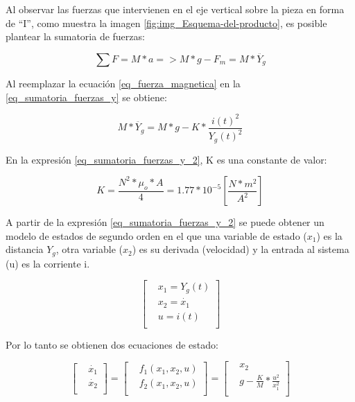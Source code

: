 \noindent Al observar las fuerzas que intervienen en el eje vertical sobre la pieza en forma de ``I'', como muestra la imagen \ref{fig:img_Esquema-del-producto}, es posible plantear la sumatoria de fuerzas:

\begin{equation}\label{eq_sumatoria_fuerzas_y}
	\sum F=M*a=>M*g-F_{m}=M*\ddot{Y_g}
\end{equation}

\noindent Al reemplazar la ecuación \ref{eq_fuerza_magnetica} en la \ref{eq_sumatoria_fuerzas_y} se obtiene:

\begin{equation}\label{eq_sumatoria_fuerzas_y_2}
	M*\ddot{Y_g}=M*g-K*\frac{i(t)^{2}}{Y_g(t)^{2}}
\end{equation}

\noindent En la expresión \ref{eq_sumatoria_fuerzas_y_2}, K es una constante de valor:

\begin{equation}
	K=\frac{N^{2}*\mu_{o}*A}{4}=1.77*10^{-5} [\frac{N*m^2}{A^2}]
\end{equation}

A partir de la expresión \ref{eq_sumatoria_fuerzas_y_2} se puede obtener un modelo de estados de segundo orden en el que una variable de estado ($x_1$) es la distancia $Y_g$, otra variable ($x_2$) es su derivada (velocidad) y la entrada al sistema (u) es la corriente i. 


\begin{equation*}
	\begin{bmatrix} %
	&x_{1}=Y_g(t)\\
	&x_{2}=\dot{x_{1}}\\
	&u=i(t)\\
	\end{bmatrix}
\end{equation*}

\noindent Por lo tanto se obtienen dos ecuaciones de estado:

\begin{equation*}
	\begin{bmatrix} %
		&\dot{x_{1}}\\
		&\dot{x_{2}}\\
	\end{bmatrix}
=
	\begin{bmatrix} %
	&f_1(x_1,x_2,u)\\
	&f_2(x_1,x_2,u)\\
\end{bmatrix}
=
	\begin{bmatrix} %
		&x_{2}\\
		&g-\frac{K}{M}*\frac{u^{2}}{x_{1}^{2}}\\
	\end{bmatrix}
\end{equation*}


